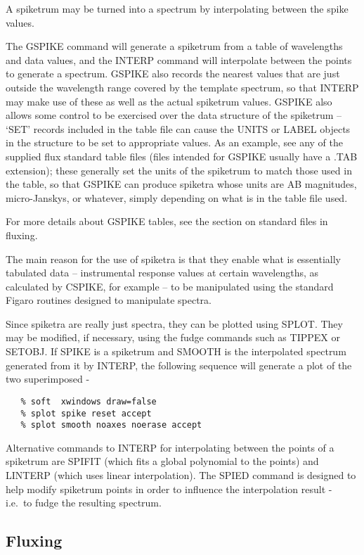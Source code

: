 A spike\-trum may be turned into a spectrum by interpolating between the
spike values.

The GSPIKE command will generate a spike\-trum from a table of 
wavelengths and data values, and the INTERP command will interpolate between
the points to generate a spectrum.  GSPIKE also records the nearest values
that are just outside the wavelength range covered by the template spectrum,
so that INTERP may make use of these as well as the actual spike\-trum values.
GSPIKE also allows some control to be exercised over the data structure of
the spike\-trum -- `SET' records included in the table file can cause the
UNITS or LABEL objects in the structure to be set to appropriate values.
As an example, see any of the supplied flux standard table files (files
intended for GSPIKE usually have a .TAB extension); these generally set the
units of the spike\-trum to match those used in the table, so that GSPIKE
can produce spiketra whose units are AB magnitudes, micro-Janskys,
or whatever, simply depending on what is in the table file used.

For more details about GSPIKE tables, see the section on standard files in
fluxing.

The main reason for the use of spiketra is that they enable 
what is essentially tabulated data -- instrumental response values at
certain wavelengths, as calculated by CSPIKE, for example -- to be
manipulated using the standard Figaro routines designed to manipulate
spectra.

Since spiketra are really just spectra, they can be plotted using 
SPLOT.  They may be modified, if necessary, using the fudge commands
such as TIP\-PEX or SETOBJ.  If SPIKE
is a spike\-trum and SMOOTH is the interpolated spectrum generated from it
by INTERP, the following sequence will generate a plot of the
two superimposed -

\begin{verbatim}
   % soft  xwindows draw=false
   % splot spike reset accept
   % splot smooth noaxes noerase accept
\end{verbatim}

Alternative commands to INTERP for interpolating between the
points of a spike\-trum are SPIFIT (which fits a global polynomial to
the points) and LINTERP (which uses linear interpolation).  The
SPIED command is designed to help modify spike\-trum points in order to
influence the interpolation result - i.e.\ to fudge the resulting spectrum.


\subsection{Fluxing}

